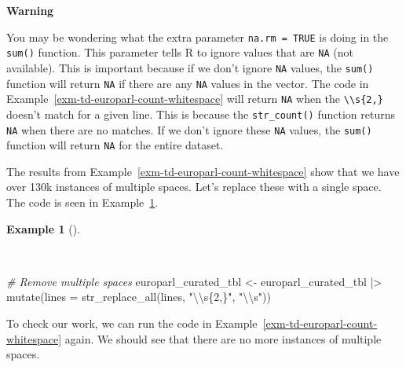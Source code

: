 \documentclass[
  letterpaper,
  DIV=11,
  numbers=noendperiod]{scrreport}
\newenvironment{Shaded}{\begin{snugshade}}{\end{snugshade}}
\newcommand{\AttributeTok}[1]{\textcolor[rgb]{0.00,0.00,0.00}{#1}}
\newcommand{\CommentTok}[1]{\textcolor[rgb]{0.00,0.00,0.00}{\textit{#1}}}
\newcommand{\FunctionTok}[1]{\textcolor[rgb]{0.00,0.00,0.00}{#1}}
\newcommand{\NormalTok}[1]{\textcolor[rgb]{0.00,0.00,0.00}{#1}}
\newcommand{\OtherTok}[1]{\textcolor[rgb]{0.00,0.00,0.00}{#1}}
\newcommand{\SpecialCharTok}[1]{\textcolor[rgb]{0.00,0.00,0.00}{#1}}
\newcommand{\StringTok}[1]{\textcolor[rgb]{0.00,0.00,0.00}{#1}}
\theoremstyle{definition}
\newtheorem{example}{Example}[chapter]
\theoremstyle{remark}
\begin{document}
\begin{tcolorbox}[enhanced jigsaw, breakable, colback=white, rightrule=.15mm, arc=.35mm, left=2mm, toprule=.15mm, leftrule=.75mm, bottomrule=.15mm, opacityback=0]

\textbf{ Warning}

You may be wondering what the extra parameter \texttt{na.rm\ =\ TRUE} is
doing in the \texttt{sum()} function. This parameter tells R to ignore
values that are \texttt{NA} (not available). This is important because
if we don't ignore \texttt{NA} values, the \texttt{sum()} function will
return \texttt{NA} if there are any \texttt{NA} values in the vector.
The code in Example~\ref{exm-td-europarl-count-whitespace} will return
\texttt{NA} when the \texttt{\textbackslash{}\textbackslash{}s\{2,\}}
doesn't match for a given line. This is because the
\texttt{str\_count()} function returns \texttt{NA} when there are no
matches. If we don't ignore these \texttt{NA} values, the \texttt{sum()}
function will return \texttt{NA} for the entire dataset.

\end{tcolorbox}

The results from Example~\ref{exm-td-europarl-count-whitespace} show
that we have over 130k instances of multiple spaces. Let's replace these
with a single space. The code is seen in
Example~\ref{exm-td-europarl-remove-multiple-whitespace}.

\begin{example}[]\protect\hypertarget{exm-td-europarl-remove-multiple-whitespace}{}\label{exm-td-europarl-remove-multiple-whitespace}

~

\begin{Shaded}
\begin{Highlighting}[]
\CommentTok{\# Remove multiple spaces}
\NormalTok{europarl\_curated\_tbl }\OtherTok{\textless{}{-}} 
\NormalTok{  europarl\_curated\_tbl }\SpecialCharTok{|\textgreater{}}
  \FunctionTok{mutate}\NormalTok{(}\AttributeTok{lines =} \FunctionTok{str\_replace\_all}\NormalTok{(lines, }\StringTok{"}\SpecialCharTok{\textbackslash{}\textbackslash{}}\StringTok{s\{2,\}"}\NormalTok{, }\StringTok{"}\SpecialCharTok{\textbackslash{}\textbackslash{}}\StringTok{s"}\NormalTok{))}
\end{Highlighting}
\end{Shaded}

\end{example}

To check our work, we can run the code in
Example~\ref{exm-td-europarl-count-whitespace} again. We should see that
there are no more instances of multiple spaces.
\end{document}
